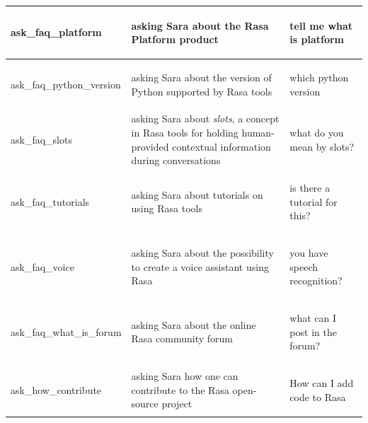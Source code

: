 \documentclass[bsc,frontabs,singlespacing,parskip,deptreport]{infthesis}
\begin{document}
{\begin{center}
\begin{longtable}{p{}|p{}|p{}}
    \hline
    \begin{spverbatim}ask_faq_platform\end{spverbatim} & asking Sara about the Rasa Platform product & \begin{spverbatim}tell me what is platform\end{spverbatim} \\
    \hline
    \begin{spverbatim}ask_faq_python_version\end{spverbatim} & asking Sara about the version of Python supported by Rasa tools & \begin{spverbatim}which python version\end{spverbatim} \\
    \hline
    \begin{spverbatim}ask_faq_slots\end{spverbatim} & asking Sara about \textit{slots}, a concept in Rasa tools for holding human-provided contextual information during conversations & \begin{spverbatim}what do you mean by slots?\end{spverbatim} \\
    \hline
    \begin{spverbatim}ask_faq_tutorials\end{spverbatim} & asking Sara about tutorials on using Rasa tools & \begin{spverbatim}is there a tutorial for this?\end{spverbatim} \\
    \hline
    \begin{spverbatim}ask_faq_voice\end{spverbatim} & asking Sara about the possibility to create a voice assistant using Rasa & \begin{spverbatim}you have speech recognition?\end{spverbatim} \\
    \hline
    \begin{spverbatim}ask_faq_what_is_forum\end{spverbatim} & asking Sara about the online Rasa community forum & \begin{spverbatim}what can I post in the forum?\end{spverbatim} \\
    \hline
    \begin{spverbatim}ask_how_contribute\end{spverbatim} & asking Sara how one can contribute to the Rasa open-source project & \begin{spverbatim}How can I add code to Rasa\end{spverbatim} \\

\end{longtable}
\end{center}}
\end{document}
